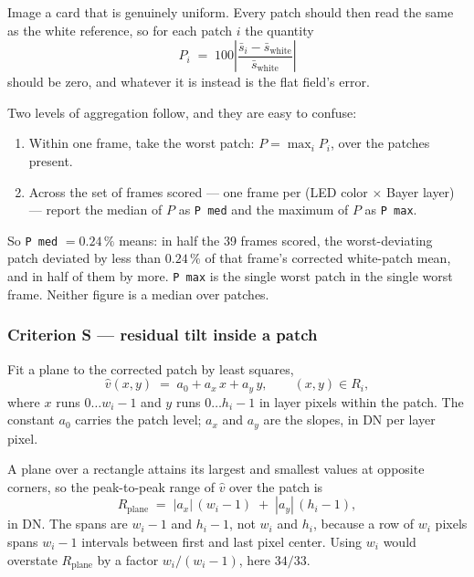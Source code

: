 \documentclass[11pt, a4paper]{article}
\newcommand{\code}[1]{\texttt{#1}}
\newcommand{\pct}{\,\%}
\begin{document}
Image a card that is genuinely uniform.
Every patch should then read the same as the white reference,
so for each patch $i$ the quantity
\begin{equation}
  P_i \;=\; 100 \left| 
  \frac{\bar{s}_i - \bar{s}_{\mathrm{white}}}{\bar{s}_{\mathrm{white}}} \right|
  \label{eq:critP}
\end{equation}
should be zero, and whatever it is instead is the flat field's error.

Two levels of aggregation follow, and they are easy to confuse:

\begin{enumerate}[nosep]
  \item Within one frame, take the worst patch:
        $P = \max_i P_i$, over the patches present.
  \item Across the set of frames scored --- one frame per
        (LED color $\times$ Bayer layer) --- report the median of $P$
        as \code{P med} and the maximum of $P$ as \code{P max}.
\end{enumerate}

So \code{P med} $= 0.24\pct$ means:
in half the 39 frames scored,
the worst-deviating patch deviated by less than $0.24\pct$
of that frame's corrected white-patch mean,
and in half of them by more.
\code{P max} is the single worst patch in the single worst frame.
Neither figure is a median over patches.

\subsubsection{Criterion S --- residual tilt inside a patch}
\label{sec:m-s}

Fit a plane to the corrected patch by least squares,
\begin{equation}
  \hat{v}(x,y) \;=\; a_0 + a_x\,x + a_y\,y ,
  \qquad (x,y) \in R_i ,
  \label{eq:plane}
\end{equation}
where $x$ runs $0 \ldots w_i-1$ and $y$ runs $0 \ldots h_i-1$
in layer pixels within the patch.
The constant $a_0$ carries the patch level;
$a_x$ and $a_y$ are the slopes, in DN per layer pixel.

A plane over a rectangle attains its largest and smallest values
at opposite corners,
so the peak-to-peak range of $\hat{v}$ over the patch is
\begin{equation}
  R_{\mathrm{plane}} \;=\; |a_x|\,(w_i - 1) \;+\; |a_y|\,(h_i - 1) ,
  \label{eq:range}
\end{equation}
in DN.
The spans are $w_i - 1$ and $h_i - 1$, not $w_i$ and $h_i$,
because a row of $w_i$ pixels spans $w_i - 1$ intervals
between first and last pixel center.
Using $w_i$ would overstate $R_{\mathrm{plane}}$
by a factor $w_i/(w_i-1)$, here $34/33$.
\end{document}
